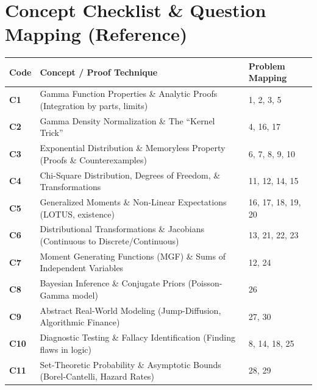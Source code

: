 \documentclass[11pt, a4paper]{article}
\theoremstyle{definition}
\theoremstyle{remark}
\begin{document}
\newpage

\section{Concept Checklist \& Question Mapping (Reference)}

\vspace{1em}
\noindent
\renewcommand{\arraystretch}{1.5}
\begin{tabularx}{\textwidth}{l X l}
\toprule
\textbf{Code} & \textbf{Concept / Proof Technique} & \textbf{Problem Mapping} \\
\midrule
\textbf{C1} & Gamma Function Properties \& Analytic Proofs (Integration by parts, limits) & 1, 2, 3, 5 \\
\textbf{C2} & Gamma Density Normalization \& The ``Kernel Trick'' & 4, 16, 17 \\
\textbf{C3} & Exponential Distribution \& Memoryless Property (Proofs \& Counterexamples) & 6, 7, 8, 9, 10 \\
\textbf{C4} & Chi-Square Distribution, Degrees of Freedom, \& Transformations & 11, 12, 14, 15 \\
\textbf{C5} & Generalized Moments \& Non-Linear Expectations (LOTUS, existence) & 16, 17, 18, 19, 20 \\
\textbf{C6} & Distributional Transformations \& Jacobians (Continuous to Discrete/Continuous) & 13, 21, 22, 23 \\
\textbf{C7} & Moment Generating Functions (MGF) \& Sums of Independent Variables & 12, 24 \\
\textbf{C8} & Bayesian Inference \& Conjugate Priors (Poisson-Gamma model) & 26 \\
\textbf{C9} & Abstract Real-World Modeling (Jump-Diffusion, Algorithmic Finance) & 27, 30 \\
\textbf{C10} & Diagnostic Testing \& Fallacy Identification (Finding flaws in logic) & 8, 14, 18, 25 \\
\textbf{C11} & Set-Theoretic Probability \& Asymptotic Bounds (Borel-Cantelli, Hazard Rates) & 28, 29 \\
\bottomrule
\end{tabularx}
\end{document}
